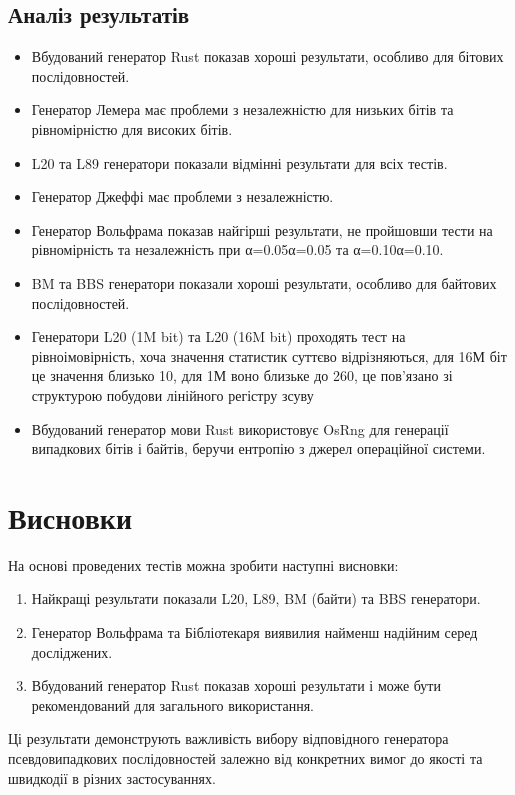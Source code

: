 \documentclass[12pt]{article}
\begin{document}
\subsection{Аналіз результатів}
\begin{itemize}
\item Вбудований генератор Rust показав хороші результати, особливо для бітових послідовностей.
\item Генератор Лемера має проблеми з незалежністю для низьких бітів та рівномірністю для високих бітів.
\item L20 та L89 генератори показали відмінні результати для всіх тестів.
\item Генератор Джеффі має проблеми з незалежністю.
\item Генератор Вольфрама показав найгірші результати, не пройшовши тести на рівномірність та незалежність при α=0.05α=0.05 та α=0.10α=0.10.
\item BM та BBS генератори показали хороші результати, особливо для байтових послідовностей.
\item Генератори L20 (1M bit) та L20 (16M bit) проходять тест на рівноімовірність, хоча значення статистик суттєво відрізняються, для 16М біт це значення близько 10, для 1М воно близьке до 260, це пов'язано зі структурою побудови лінійного регістру зсуву
\item Вбудований генератор мови Rust використовує OsRng для генерації випадкових бітів і байтів, беручи ентропію з джерел операційної системи.
\end{itemize}

\section{Висновки}
На основі проведених тестів можна зробити наступні висновки:
\begin{enumerate}
\item Найкращі результати показали L20, L89, BM (байти) та BBS генератори.
\item Генератор Вольфрама та Бібліотекаря виявилия найменш надійним серед досліджених.
\item Вбудований генератор Rust показав хороші результати і може бути рекомендований для загального використання.
\end{enumerate}

Ці результати демонструють важливість вибору відповідного генератора псевдовипадкових послідовностей залежно від конкретних вимог до якості та швидкодії в різних застосуваннях.
\end{document}
